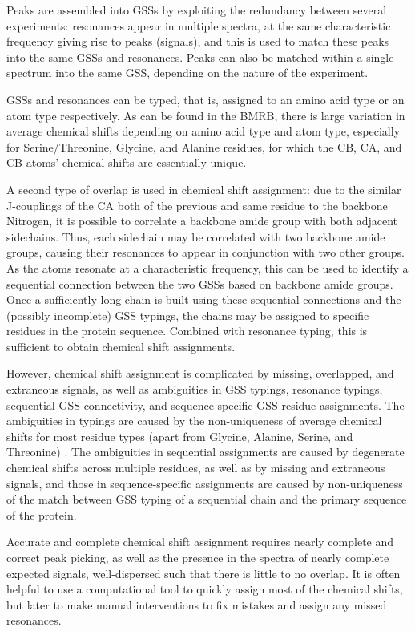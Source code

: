 Peaks are assembled into GSSs by exploiting the redundancy between several 
experiments: resonances appear in multiple spectra, at the same characteristic
frequency giving rise to peaks (signals), and this is used to match these
peaks into the same GSSs and resonances.  Peaks can also be matched within
a single spectrum into the same GSS, depending on the nature of the experiment.

GSSs and resonances can be typed, that is, assigned to an amino acid type or
an atom type respectively.  As can be found in the BMRB, there is large 
variation in average chemical shifts depending on amino acid type and atom type,
especially for Serine/Threonine, Glycine, and Alanine residues, for which the
CB, CA, and CB atoms' chemical shifts are essentially unique.

A second type of overlap is used in chemical shift assignment: due to the 
similar J-couplings of the CA both of the previous and same residue to the
backbone Nitrogen, it is possible to correlate a backbone amide group with
both adjacent sidechains.  Thus, each sidechain may be correlated with two
backbone amide groups, causing their resonances to appear in conjunction with
two other groups.  As the atoms resonate at a characteristic frequency, this
can be used to identify a sequential connection between the two GSSs based on
backbone amide groups.  Once a sufficiently long chain is built using these
sequential connections and the (possibly incomplete) GSS typings, the chains 
may be assigned to specific residues in the protein sequence.  Combined with
resonance typing, this is sufficient to obtain chemical shift assignments.

However, chemical shift assignment is complicated by missing, overlapped, and
extraneous signals, as well as ambiguities in GSS typings, resonance typings,
sequential GSS connectivity, and sequence-specific GSS-residue assignments. 
The ambiguities in typings are caused by the non-uniqueness of average chemical
shifts for most residue types (apart from Glycine, Alanine, Serine, and 
Threonine) \cite{bmrb}.  The ambiguities in sequential
assignments are caused by degenerate chemical shifts across multiple residues,
as well as by missing and extraneous signals, and those in sequence-specific
assignments are caused by non-uniqueness of the match between GSS typing
of a sequential chain and the primary sequence of the protein.

Accurate and complete chemical shift assignment requires nearly complete and
correct peak picking, as well as the presence in the spectra of nearly complete
expected signals, well-dispersed such that there is little to no overlap.  It
is often helpful to use a computational tool to quickly assign most of the
chemical shifts, but later to make manual interventions to fix mistakes and
assign any missed resonances.

